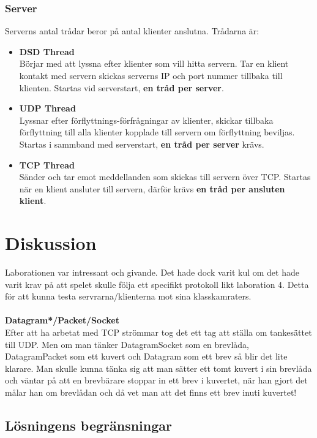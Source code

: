 \documentclass[10pt, titlepage, oneside, a4paper]{article}
\begin{document}
			\subsubsection{Server}
				Serverns antal trådar beror på antal klienter anslutna. Trådarna är:
				\begin{itemize}
					\item \textbf{DSD Thread}\\Börjar med att lyssna efter klienter som vill hitta servern. Tar en klient kontakt med servern skickas serverns IP och port nummer tillbaka till klienten. Startas vid serverstart, \textbf{en tråd per server}.
					\item \textbf{UDP Thread}\\Lyssnar efter förflyttnings-förfrågningar av klienter, skickar tillbaka förflyttning till alla klienter kopplade till servern om förflyttning beviljas. Startas i sammband med serverstart, \textbf{en tråd per server} krävs.
					\item \textbf{TCP Thread}\\Sänder och tar emot meddellanden som skickas till servern över TCP. Startas när en klient ansluter till servern, därför krävs \textbf{en tråd per ansluten klient}.
				\end{itemize}
	
	\newpage
	\section{Diskussion}
		Laborationen var intressant och givande. Det hade dock varit kul om det hade varit krav på att spelet skulle följa ett specifikt protokoll likt laboration 4. Detta för att kunna testa servrarna/klienterna mot sina klasskamraters.\\\\
		\textbf{Datagram*/Packet/Socket}\\Efter att ha arbetat med TCP strömmar tog det ett tag att ställa om tankesättet till UDP. Men om man tänker DatagramSocket som en brevlåda, DatagramPacket som ett kuvert och Datagram som ett brev så blir det lite klarare. Man skulle kunna tänka sig att man sätter ett tomt kuvert i sin brevlåda och väntar på att en brevbärare stoppar in ett brev i kuvertet, när han gjort det målar han om brevlådan och då vet man att det finns ett brev inuti kuvertet!
		
		\subsection{Lösningens begränsningar} 
\end{document}
